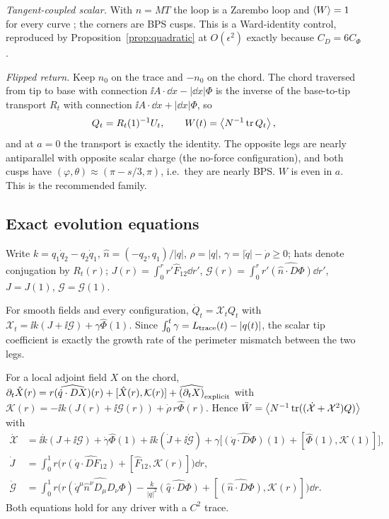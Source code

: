 \emph{Tangent-coupled scalar.} With $n=MT$ the loop is a Zarembo loop and $\left\langle W\right\rangle=1$ for every curve
\cite{Zarembo,GuralnikKulik,DGGM}; the corners are BPS cusps. This is a Ward-identity control, reproduced by
Proposition~\ref{prop:quadratic} at $O(\epsilon^2)$ exactly because $C_D=6C_\Phi$.

\emph{Flipped return.} Keep $n_0$ on the trace and $-n_0$ on the chord. The chord traversed from tip to base
with connection $\ii A\cdot\dd x-|\dd x|\Phi$ is the inverse of the base-to-tip transport $R_t$ with connection
$\ii A\cdot\dd x+|\dd x|\Phi$, so
\begin{equation}
Q_t=R_t(1)^{-1}U_t,\qquad W(t)=\left\langle N^{-1}\operatorname{tr} Q_t\right\rangle,
\end{equation}
and at $a=0$ the transport is exactly the identity. The opposite legs are nearly antiparallel with opposite
scalar charge (the no-force configuration), and both cusps have $(\varphi,\theta)\approx(\pi-s/3,\pi)$, i.e.\ they
are nearly BPS. $W$ is even in $a$. This is the recommended family.

\subsection{Exact evolution equations}

Write $k=q_1\dot q_2-q_2\dot q_1$, $\hat n=(-q_2,q_1)/|q|$, $\rho=|q|$, $\gamma=|\dot q|-\dot\rho\ge0$; hats denote
conjugation by $R_t(r)$; $J(r)=\int_0^rr'\hat F_{12}\dd r'$, $\mathcal G(r)=\int_0^rr'\widehat{(\hat n\cdot D\Phi)}\dd r'$,
$J=J(1)$, $\mathcal G=\mathcal G(1)$.

\begin{proposition}
\label{prop:first}
For smooth fields and every configuration,
$\dot Q_t=\mathcal X_tQ_t$ with $\mathcal X_t=\ii k(J+\ii\mathcal G)+\gamma\hat\Phi(1)$. Since
$\int_0^t\gamma=L_{\rm trace}(t)-|q(t)|$, the scalar tip coefficient is exactly the growth rate of the perimeter
mismatch between the two legs.
\end{proposition}

\begin{proposition}
\label{prop:second}
For a local adjoint field $X$ on the chord,
$\partial_t\hat X(r)=r\widehat{(\dot q\cdot DX)}(r)+[\hat X(r),\mathcal K(r)]+\widehat{(\partial_tX)}_{\rm explicit}$
with $\mathcal K(r)=-\ii k(J(r)+\ii\mathcal G(r))+\dot\rho\,r\hat\Phi(r)$. Hence
$\ddot W=\left\langle N^{-1}\operatorname{tr}((\dot{\mathcal X}+\mathcal X^2)Q)\right\rangle$ with
\begin{align}
\dot{\mathcal X}&=\ii\dot k(J+\ii\mathcal G)+\dot\gamma\hat\Phi(1)+\ii k(\dot J+\ii\dot{\mathcal G})
+\gamma\big[\widehat{(\dot q\cdot D\Phi)}(1)+[\hat\Phi(1),\mathcal K(1)]\big],\\
\dot J&=\int_0^1r\big(r\widehat{(\dot q\cdot DF_{12})}+[\hat F_{12},\mathcal K(r)]\big)\dd r,\\
\dot{\mathcal G}&=\int_0^1r\Big(r\widehat{(\dot q^\mu\hat n^\nu D_\mu D_\nu\Phi)}-\frac{k}{|q|^2}\widehat{(\hat q\cdot D\Phi)}
+[\widehat{(\hat n\cdot D\Phi)},\mathcal K(r)]\Big)\dd r .
\end{align}
Both equations hold for any driver with a $C^2$ trace.
\end{proposition}

